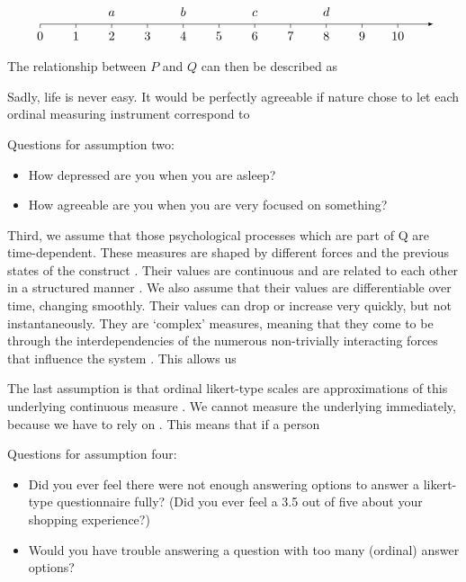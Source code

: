 \documentclass[utf8]{FrontiersinVancouver}
\begin{document}
\[
\begin{tikzpicture}
    \draw[-latex] (0,0) -- (11,0);
    \foreach \x in {0,...,10}
        \draw (\x,0) -- (\x,-3pt);
    \foreach \x in {0,...,10}
        \node [below] at (\x,-0.1) {$\x$};
    \foreach \x\y in {2/a,4/b,6/c,8/d}
        \node [above] at (\x,0.1) {$\y$};
\end{tikzpicture}
\]

The relationship between $P$ and $Q$ can then be described as 

Sadly, life is never easy. It would be perfectly agreeable if nature chose to let each ordinal measuring instrument correspond to 

\begin{framed}
    Questions for assumption two:
    \begin{itemize}
        \item How depressed are you when you are asleep?
        \item How agreeable are you when you are very focused on something?
    \end{itemize}
\end{framed}

Third, we assume that those psychological processes which are part of Q are time-dependent. These measures are shaped by different forces and the previous states of the construct \citep{olthofComplexityPsychologicalSelfratings2020b}. Their values are continuous and are related to each other in a structured manner \citep{bokerConsequencesContinuityHunt2002}. We also assume that their values are differentiable over time, changing smoothly. Their values can drop or increase very quickly, but not instantaneously. They are `complex' measures, meaning that they come to be through the interdependencies of the numerous non-trivially interacting forces that influence the system \citep{olthofComplexityTheoryPsychopathology2023}. This allows us 

The last assumption is that ordinal likert-type scales are approximations of this underlying continuous measure \citep{haslbeckRecoveringWithinpersonDynamics2022}. We cannot measure the underlying immediately, because we have to rely on . This means that if a person

\begin{framed}
    Questions for assumption four:
    \begin{itemize}
        \item Did you ever feel there were not enough answering options to answer a likert-type questionnaire fully? (Did you ever feel a 3.5 out of five about your shopping experience?)
        \item Would you have trouble answering a question with too many (ordinal) answer options?
    \end{itemize}
\end{framed}
\end{document}
